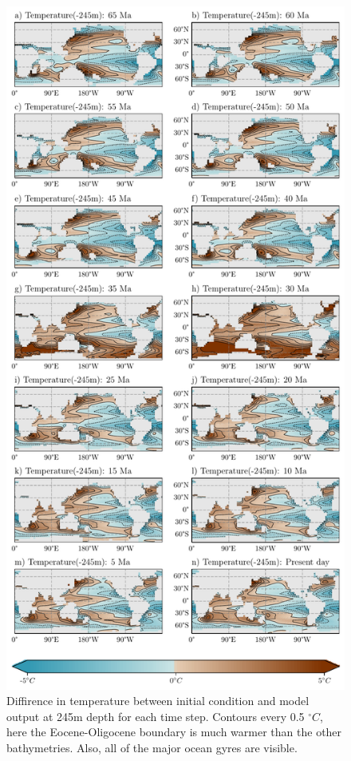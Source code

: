 \documentclass[a4paper]{article}
\begin{document}
\begin{figure}[H]
	\centering
	\includegraphics[width=0.7\linewidth]{full_sst.pdf}
	\caption{Diffirence in temperature between initial condition and model output at 245m depth for each time step. Contours every 0.5 $^{\circ}C$, here the Eocene-Oligocene boundary is much warmer than the other bathymetries. Also, all of the major ocean gyres are visible.}
	\label{fig:sst_total}
\end{figure}
\end{document}
